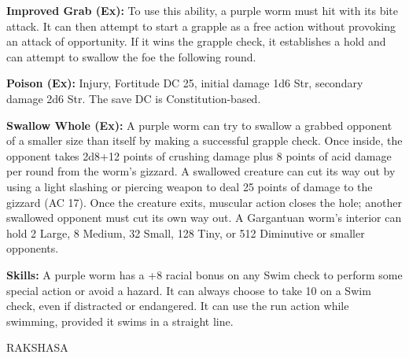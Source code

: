 \documentclass{article}
\begin{document}
\textbf{Improved Grab (Ex): }To use this ability, a purple worm must hit with its 
bite attack. It can then attempt to start a grapple as a free action without provoking 
an attack of opportunity. If it wins the grapple check, it establishes a hold and 
can attempt to swallow the foe the following round.

\textbf{Poison (Ex): }Injury, Fortitude DC 25, initial damage 1d6 Str, secondary 
damage 2d6 Str. The save DC is Constitution-based.

\textbf{Swallow Whole (Ex):} A purple worm can try to swallow a grabbed opponent 
of a smaller size than itself by making a successful grapple check. Once inside, 
the opponent takes 2d8+12 points of crushing damage plus 8 points of acid damage 
per round from the worm's gizzard. A swallowed creature can cut its way out by 
using a light slashing or piercing weapon to deal 25 points of damage to the gizzard 
(AC 17). Once the creature exits, muscular action closes the hole; another swallowed 
opponent must cut its own way out. A Gargantuan worm's interior can hold 2 Large, 
8 Medium, 32 Small, 128 Tiny, or 512 Diminutive or smaller opponents.

\textbf{Skills:} A purple worm has a +8 racial bonus on any Swim check to perform 
some special action or avoid a hazard. It can always choose to take 10 on a Swim 
check, even if distracted or endangered. It can use the run action while swimming, 
provided it swims in a straight line.

\vspace{12pt}
{\LARGE{}RAKSHASA}
\end{document}
